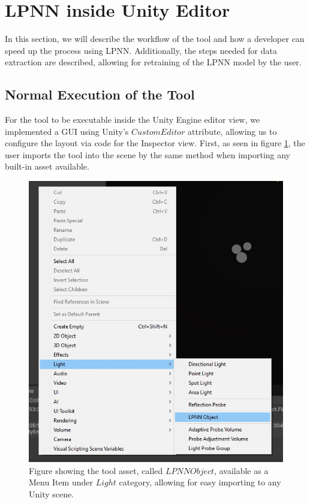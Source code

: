 \section{LPNN inside Unity Editor}
\label{sec:LPNN_UI}

In this section, we will describe the workflow of the tool and how a developer can speed up the process using LPNN. Additionally, the steps needed for data extraction are described, allowing for retraining of the LPNN model by the user.

\subsection{Normal Execution of the Tool}

For the tool to be executable inside the Unity Engine editor view, we implemented a GUI using Unity's $CustomEditor$ attribute, allowing us to configure the layout via code for the Inspector view. First, as seen in figure \ref{fig:UI_add}, the user imports the tool into the scene by the same method when importing any built-in asset available.

\begin{figure}[h]
	\centering
	\includegraphics[scale=0.6]{Graphics/UI_lpnn.jpg}
	\caption{Figure showing the tool asset, called $LPNN Object$, available as a Menu Item under $Light$ category, allowing for easy importing to any Unity scene.}
	\label{fig:UI_add}
\end{figure}

